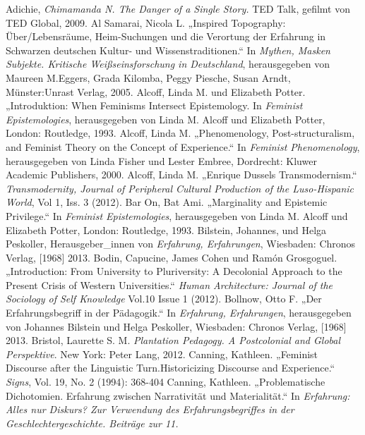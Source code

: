 \begin{thebibliography}{100} %
  Adichie, \emph{Chimamanda N. The Danger of a Single Story.} TED Talk, gefilmt von TED Global, 2009. 
 Al Samarai, Nicola L. „Inspired Topography: Über/Lebensräume, Heim-Suchungen und die
Verortung der Erfahrung in Schwarzen deutschen Kultur- und Wissenstraditionen.“
In \emph{Mythen, Masken Subjekte. Kritische Weißseinsforschung in Deutschland}, herausgegeben von Maureen M.Eggers, Grada Kilomba, Peggy Piesche, Susan Arndt, Münster:Unrast Verlag, 2005.
 Alcoff, Linda M. und Elizabeth Potter. „Introduktion: When Feminisms Intersect Epistemology. In
\emph{Feminist Epistemologies}, herausgegeben von Linda M. Alcoff und Elizabeth Potter, London: Routledge, 1993.
 Alcoff, Linda M. „Phenomenology, Post-structuralism, and Feminist Theory on the Concept of
Experience.“ In \emph{Feminist Phenomenology}, herausgegeben von Linda Fisher und Lester Embree, Dordrecht: Kluwer Academic Publishers, 2000.
 Alcoff, Linda M. „Enrique Dussels Transmodernism.“ \emph{Transmodernity, Journal of Peripheral
Cultural Production of the Luso-Hispanic World}, Vol 1, Iss. 3 (2012).
 Bar On, Bat Ami. „Marginality and Epistemic Privilege.“ In
\emph{Feminist Epistemologies},
herausgegeben von Linda M. Alcoff und Elizabeth Potter, London: Routledge, 1993.
 Bilstein, Johannes, und  Helga Peskoller, Herausgeber\_innen von
\emph{Erfahrung, Erfahrungen}, Wiesbaden: Chronos Verlag, [1968] 2013.
 Bodin, Capucine, James Cohen und Ramón Grosgoguel. „Introduction: From University to
Pluriversity: A Decolonial Approach to the Present Crisis of Western
Universities.“ \emph{Human Architecture: Journal of the Sociology of Self
Knowledge} Vol.10 Issue 1 (2012).
 Bollnow, Otto F. „Der Erfahrungsbegriff in der Pädagogik.“ In
\emph{Erfahrung, Erfahrungen},
herausgegeben von Johannes Bilstein und Helga Peskoller, Wiesbaden: Chronos Verlag, [1968] 2013.
 Bristol, Laurette S. M. \emph{Plantation Pedagogy. A
Postcolonial and Global Perspektive}. New York:
Peter Lang, 2012.
 Canning, Kathleen. „Feminist Discourse after the Linguistic Turn.Historicizing Discourse and
Experience.“ \emph{Signs}, Vol. 19, No. 2 (1994): 368-404
 Canning, Kathleen. „Problematische Dichotomien. Erfahrung zwischen Narrativität und
Materialität.“ In \emph{Erfahrung: Alles nur Diskurs? Zur Verwendung des
  Erfahrungsbegriffes in der Geschlechtergeschichte. Beiträge zur 11.
}
\end{thebibliography}
